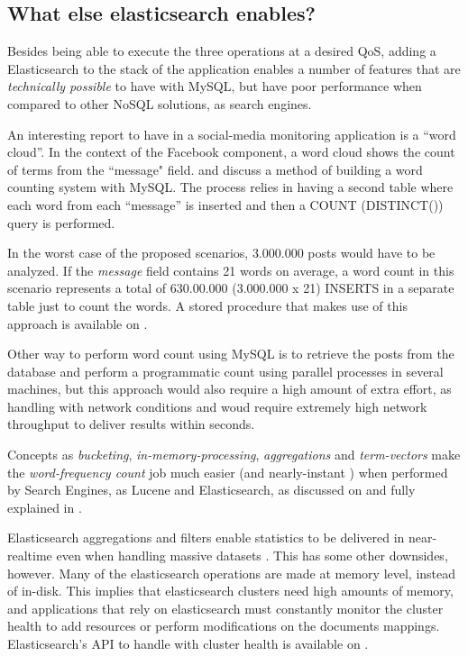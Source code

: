 \subsection{What else elasticsearch enables?}

Besides being able to execute the three operations at a desired QoS, adding a Elasticsearch to the stack of the application enables a number of features that are \textit{technically possible} to have with MySQL, but have poor performance when compared to other NoSQL solutions, as search engines.

An interesting report to have in a social-media monitoring application is a ``word cloud''. In the context of the Facebook component, a word cloud shows the count of terms from the ``message" field. \cite{mysqlstringsplitter} and \cite{mysqlSplitterStoredProcedure} discuss a method of building a word counting system with MySQL. The process relies in having a second table where each word from each ``message'' is inserted and then a COUNT (DISTINCT()) query is performed. 

In the worst case of the proposed scenarios, 3.000.000 posts would have to be analyzed. If the \textit{message} field contains 21 words on average, a word count in this scenario represents a total of 630.00.000 (3.000.000 x 21) INSERTS in a separate table just to count the words. A stored procedure that makes use of this approach is available on \cite{mysqlSplitterStoredProcedure}.

Other way to perform word count using MySQL is to retrieve the posts from the database and perform a programmatic count using parallel processes in several machines, but this approach would also require a high amount of extra effort, as handling with network conditions and woud require extremely high network throughput to deliver results within seconds. 

Concepts as \textit{bucketing}, \textit{in-memory-processing}, \textit{aggregations} and \textit{term-vectors} make the \textit{word-frequency count} job much easier (and nearly-instant \cite{termVectorsES}) when performed by Search Engines, as Lucene and Elasticsearch, as discussed on \cite{mysqlSplitterStoredProcedure} and fully explained in \cite{termVectorsES}.

Elasticsearch aggregations and filters enable statistics to be delivered in near-realtime even when handling massive datasets \cite{termVectorsES}. This has some other downsides, however. Many of the elasticsearch operations are made at memory level, instead of in-disk. This implies that elasticsearch clusters need high amounts of memory, and applications that rely on elasticsearch must constantly monitor the cluster health to add resources or perform modifications on the documents mappings. Elasticsearch's API to handle with cluster health is available on \cite{clusterHealthES}. 

